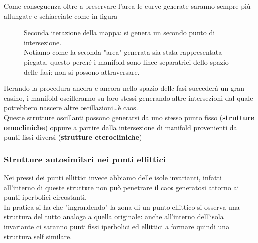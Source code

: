 Come conseguenza oltre a preservare l'area le curve generate saranno sempre più allungate e schiacciate come in figura %
\begin{figure}[H]
    \centering
    \caption{\scriptsize Seconda iterazione della mappa: si genera un secondo punto di intersezione. \\ Notiamo come la seconda "area" generata sia stata rappresentata piegata, questo perché i manifold sono linee separatrici dello spazio delle fasi: non si possono attraversare.}
    \label{fig:19_itero2}
\end{figure}
\noindent
Iterando la procedura ancora e ancora nello spazio delle fasi succederà un gran casino, i manifold oscilleranno su loro stessi generando altre intersezioni dal quale potrebbero nascere altre oscillazioni\ldots è caos.\\
Queste strutture oscillanti possono generarsi da uno stesso punto fisso (\textbf{strutture omocliniche}) oppure a partire dalla intersezione di manifold provenienti da punti fissi diversi (\textbf{strutture eterocliniche})
\subsubsection{Strutture autosimilari nei punti ellittici}%
\label{subsub:Strutture autosimilari nei punti ellittici}
Nei pressi dei punti ellittici invece abbiamo delle isole invarianti, infatti all'interno di queste strutture non può penetrare il caos generatosi attorno ai punti iperbolici circostanti. \\
In pratica si ha che "ingrandendo" la zona di un punto ellittico si osserva una struttura del tutto analoga a quella originale: anche all'interno dell'isola invariante ci saranno punti fissi iperbolici ed ellittici a formare quindi una struttura self similare.
\clearpage
